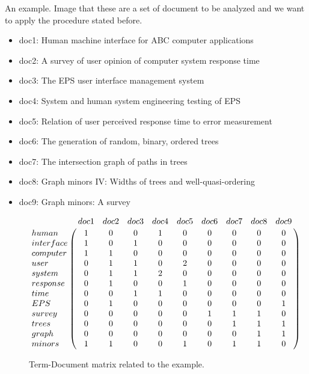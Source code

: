 An example.
Image that these are a set of document to be analyzed and we want to apply the procedure stated before.
\begin{itemize}
	\item doc1: Human machine interface for ABC computer applications
	\item doc2: A survey of user opinion of computer system response time
	\item doc3: The EPS user interface management system
	\item doc4: System and human system engineering testing of EPS
	\item doc5: Relation of user perceived response time to error measurement
	\item doc6: The generation of random, binary, ordered trees
	\item doc7: The intersection graph of paths in trees
	\item doc8: Graph minors IV: Widths of trees and well-quasi-ordering
	\item doc9: Graph minors: A survey
\end{itemize}

\begin{figure}[h!]
	\begin{equation} \nonumber
	\bordermatrix{~ & doc1 & doc2 & doc3 & doc4 & doc5 & doc6 & doc7 & doc8 & doc9 \cr	
		human	& 1 & 0 & 0 & 1 & 0 & 0 & 0 & 0 & 0 \cr
		interface	& 1 & 0 & 1 & 0 & 0 & 0 & 0 & 0 & 0 \cr
		computer	& 1 & 1 & 0 & 0 & 0 & 0 & 0 & 0 & 0 \cr    
		user 		& 0 & 1 & 1 & 0 & 2 & 0 & 0 & 0 & 0 \cr
		system 	& 0 & 1 & 1 & 2 & 0 & 0 & 0 & 0 & 0 \cr
		response	& 0 & 1 & 0 & 0 & 1 & 0 & 0 & 0 & 0 \cr
		time 		& 0 & 0 & 1 & 1 & 0 & 0 & 0 & 0 & 0 \cr
		EPS 		& 0 & 1 & 0 & 0 & 0 & 0 & 0 & 0 & 1 \cr
		survey	& 0 & 0 & 0 & 0 & 0 & 1 & 1 & 1 & 0 \cr
		trees 		& 0 & 0 & 0 & 0 & 0 & 0 & 1 & 1 & 1 \cr
		graph 		& 0 & 0 & 0 & 0 & 0 & 0 & 0 & 1 & 1 \cr
		minors		& 1 & 1 & 0 & 0 & 1 & 0 & 1 & 1 & 0 \cr	  }
	\end{equation}
	\caption{Term-Document matrix related to the example.}
	\label{fig:TDM}
\end{figure}

